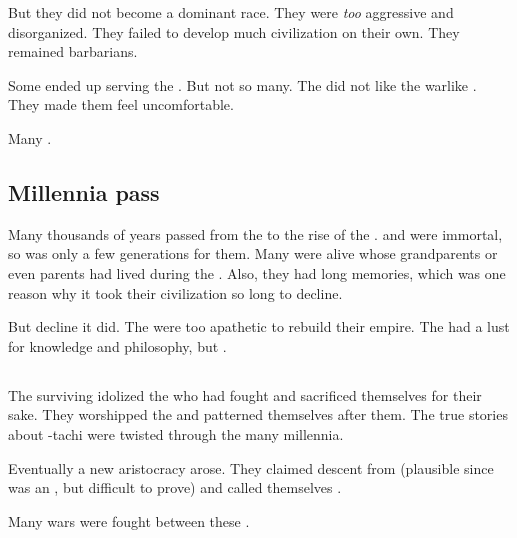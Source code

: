 But they did not become a dominant race. 
They were \emph{too} aggressive and disorganized. 
They failed to develop much civilization on their own. 
They remained barbarians. 

Some \cregorrs{} ended up serving the \quiljaaran. 
But not so many. 
The \quiljaaran{} did not like the warlike \cregorrs. 
They made them feel uncomfortable. 

Many \cregorrs{} .









\subsection{Millennia pass}
Many thousands of years passed from the \firstbanewar{} to the rise of the \aryothim. 
\Dragons and \quiljaaran{} were immortal, so  was only a few generations for them. 
Many were alive whose grandparents or even parents had lived during the \banewar. 
Also, they had long memories, which was one reason why it took their civilization so long to decline. 

But decline it did.
The \quiljaaran were too apathetic to rebuild their empire. 
The \quiljaaran had a lust for knowledge and philosophy, but . 









\subsection{\Dragonkings}
The surviving \ophidians idolized the \dragons who had fought and sacrificed themselves for their sake. 
They worshipped the \dragons and patterned themselves after them. 
The true stories about \Sethicus-tachi were twisted through the many millennia. 

Eventually a new aristocracy arose. 
They claimed descent from \Sethicus (plausible since \Sethicus was an \ophidian, but difficult to prove) and called themselves \quo{\dragonkings}. 

Many wars were fought between these \dragonkings. 









